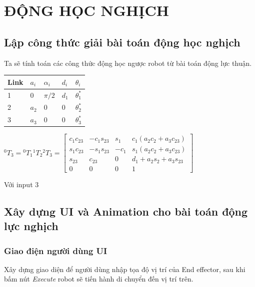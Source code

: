 \section{ĐỘNG HỌC NGHỊCH}
\subsection{Lập công thức giải bài toán động học nghịch}
Ta sẽ tính toán các công thức động học ngược robot từ bài toán động lực thuận.
\begin{center}
	\begin{tabular}{|m{2cm}|m{2cm}|m{2cm}|m{2cm}|m{2cm}|} 
		\hline
		Link & $a_{i}$ & $\alpha_{i}$ & $d_{i}$ & $\theta_{i}$\\ [0.5ex] 
		\hline
		1 & 0 & $\pi/2$ & $d_{1}$ & $\theta_{1}^{*}$\\ 
		\hline
		2 & $a_{2}$ & 0 & 0 & $\theta_{2}^{*}$\\
		\hline
		3 & $a_{3}$ & 0 & 0 & $\theta_{3}^{*}$\\ [0.5ex] 
		\hline
	\end{tabular}
\end{center}

\begin{center}
$^{0}T_{3} = {^{0}T_{1}} {^{1}T_{2}} {^{2}T_{3}} = \begin{bmatrix}
	c_{1}c_{23} & -c_{1}s_{23} & s_{1} & c_{1}(a_{2}c_{2}+a_{3}c_{23})\\
	s_{1}c_{23} & -s_{1}s_{23} & -c_{1} & s_{1}(a_{2}c_{2}+a_{3}c_{23})\\
	s_{23} & c_{23} & 0 & d_{1}+ a_{2}s_{2}+a_{3}s_{23}\\
	0 & 0 & 0 & 1
\end{bmatrix}$
\end{center}

Với input $3$

\subsection{Xây dựng UI và Animation cho bài toán động lực nghịch}
\subsubsection{Giao điện người dùng UI}

Xây dựng giao diện để người dùng nhập tọa độ vị trí của End effector, sau khi bấm nút \textit{Execute} robot sẽ tiến hành di chuyển đến vị trí trên.

